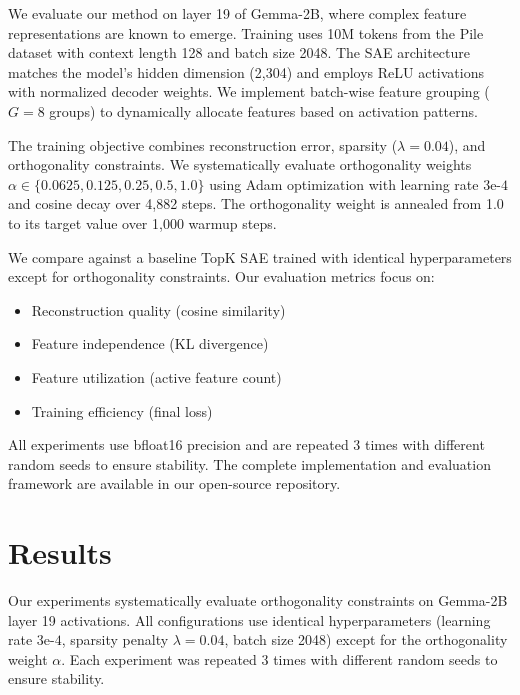 \documentclass{article} %
\begin{document}
We evaluate our method on layer 19 of Gemma-2B, where complex feature representations are known to emerge. Training uses 10M tokens from the Pile dataset with context length 128 and batch size 2048. The SAE architecture matches the model's hidden dimension (2,304) and employs ReLU activations with normalized decoder weights. We implement batch-wise feature grouping ($G=8$ groups) to dynamically allocate features based on activation patterns.

The training objective combines reconstruction error, sparsity ($\lambda=0.04$), and orthogonality constraints. We systematically evaluate orthogonality weights $\alpha \in \{0.0625, 0.125, 0.25, 0.5, 1.0\}$ using Adam optimization with learning rate $3\text{e-}4$ and cosine decay over 4,882 steps. The orthogonality weight is annealed from 1.0 to its target value over 1,000 warmup steps.

We compare against a baseline TopK SAE trained with identical hyperparameters except for orthogonality constraints. Our evaluation metrics focus on:

\begin{itemize}
    \item Reconstruction quality (cosine similarity)
    \item Feature independence (KL divergence)
    \item Feature utilization (active feature count)
    \item Training efficiency (final loss)
\end{itemize}

All experiments use bfloat16 precision and are repeated 3 times with different random seeds to ensure stability. The complete implementation and evaluation framework are available in our open-source repository.

\section{Results}
\label{sec:results}

Our experiments systematically evaluate orthogonality constraints on Gemma-2B layer 19 activations. All configurations use identical hyperparameters (learning rate $3\text{e-}4$, sparsity penalty $\lambda=0.04$, batch size 2048) except for the orthogonality weight $\alpha$. Each experiment was repeated 3 times with different random seeds to ensure stability.
\end{document}
